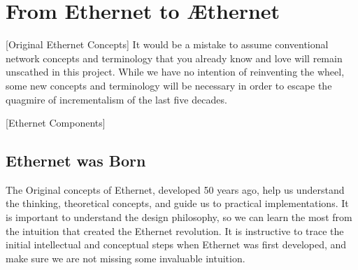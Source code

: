 \documentclass[../../../OAE-SPEC-MAIN.tex]{subfiles}
\begin{document}

\section{From Ethernet to Æthernet}


[Original Ethernet Concepts]
It would be a mistake to assume conventional network concepts and terminology that you already know and love will remain unscathed in this project. While we have no intention of reinventing the wheel,  some new concepts and terminology will be necessary in order to escape the quagmire of incrementalism of the last five decades.  


 
[Ethernet Components]

\subsection{Ethernet was Born}

The Original concepts of Ethernet, developed 50 years ago, help us understand the thinking, theoretical concepts, and guide us  to practical implementations. It is important to understand the design philosophy, so we can learn the most from the intuition that created the Ethernet revolution.  It is instructive to trace the initial intellectual and conceptual steps when Ethernet was first developed, and make sure we are not missing some invaluable intuition.
\end{document}
